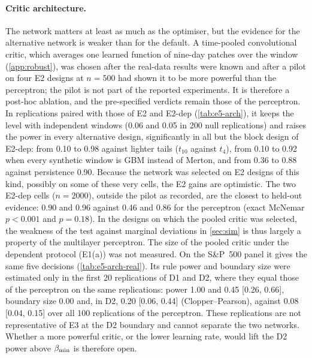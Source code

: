 \paragraph{Critic architecture.}
The network matters at least as much as the optimiser, but the evidence for the alternative
network is weaker than for the default. A time-pooled convolutional critic, which averages one
learned function of nine-day patches over the window (\cref{app:robust}), was chosen after the
real-data results were known and after a pilot on four E2 designs at $n=500$ had shown it to be
more powerful than the perceptron; the pilot is not part of the reported experiments. It is
therefore a post-hoc ablation, and the pre-specified verdicts remain those of the perceptron. In
replications paired with those of E2 and E2-dep (\cref{tab:e5-arch}), it keeps the level with
independent windows (0.06 and 0.05 in 200 null replications) and raises the power in every
alternative design, significantly in all but the block design of E2-dep: from 0.10 to 0.98
against lighter tails ($t_{10}$ against $t_4$), from 0.10 to 0.92 when every synthetic window is
GBM instead of Merton, and from 0.36 to 0.88 against persistence 0.90. Because the network was
selected on E2 designs of this kind, possibly on some of these very cells, the E2 gains are
optimistic. The two E2-dep cells ($n=2000$), outside the pilot as recorded, are the closest to
held-out evidence: 0.90 and 0.96 against 0.46 and 0.86 for the perceptron (exact McNemar
$p<0.001$ and $p=0.18$). In the designs on which the pooled critic was selected, the weakness of
the \WC{} test against marginal deviations in \cref{sec:sim} is thus largely a property of the
multilayer perceptron. The size of the pooled critic under the dependent protocol (E1(a)) was not
measured. On the S\&P~500 panel it gives the same five decisions (\cref{tab:e5-arch-real}). Its
rule power and boundary size were estimated only in the first 20 replications of D1 and D2, where
they equal those of the perceptron on the same replications: power 1.00 and 0.45 [0.26, 0.66],
boundary size 0.00 and, in D2, 0.20 [0.06, 0.44] (Clopper--Pearson), against 0.08 [0.04, 0.15]
over all 100 replications of the perceptron. These replications are not representative of E3 at
the D2 boundary and cannot separate the two networks. Whether a more powerful critic, or the
lower learning rate, would lift the D2 power above $\beta_{\min}$ is therefore open.

